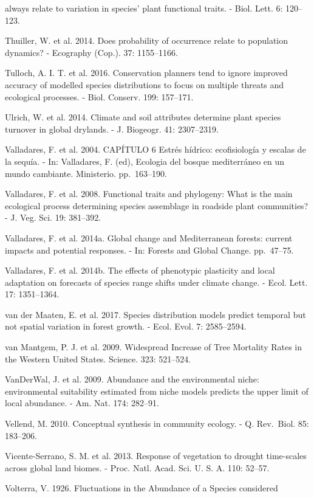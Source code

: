 \documentclass[11pt,twoside]{reedthesis}
\begin{document}
always relate to variation in species' plant functional traits. - Biol.
Lett. 6: 120--123.\par
Thuiller, W. et al. 2014. Does probability of occurrence relate to
population dynamics? - Ecography (Cop.). 37: 1155--1166.\par
Tulloch, A. I. T. et al. 2016. Conservation planners tend to ignore
improved accuracy of modelled species distributions to focus on multiple
threats and ecological processes. - Biol. Conserv. 199: 157--171.\par
Ulrich, W. et al. 2014. Climate and soil attributes determine plant
species turnover in global drylands. - J. Biogeogr. 41: 2307--2319.\par
Valladares, F. et al. 2004. CAPÍTULO 6 Estrés hídrico: ecofisiología y
escalas de la sequía. - In: Valladares, F. (ed), Ecologia del bosque
mediterráneo en un mundo cambiante. Ministerio. pp.~163--190.\par
Valladares, F. et al. 2008. Functional traits and phylogeny: What is the
main ecological process determining species assemblage in roadside plant
communities? - J. Veg. Sci. 19: 381--392.\par
Valladares, F. et al. 2014a. Global change and Mediterranean forests:
current impacts and potential responses. - In: Forests and Global
Change. pp.~47--75.\par
Valladares, F. et al. 2014b. The effects of phenotypic plasticity and
local adaptation on forecasts of species range shifts under climate
change. - Ecol. Lett. 17: 1351--1364.\par
van der Maaten, E. et al. 2017. Species distribution models predict
temporal but not spatial variation in forest growth. - Ecol. Evol. 7:
2585--2594.\par
van Mantgem, P. J. et al. 2009. Widespread Increase of Tree Mortality
Rates in the Western United States. Science. 323: 521--524.\par
VanDerWal, J. et al. 2009. Abundance and the environmental niche:
environmental suitability estimated from niche models predicts the upper
limit of local abundance. - Am. Nat. 174: 282--91.\par
Vellend, M. 2010. Conceptual synthesis in community ecology. - Q.
Rev.~Biol. 85: 183--206.\par
Vicente-Serrano, S. M. et al. 2013. Response of vegetation to drought
time-scales across global land biomes. - Proc. Natl. Acad. Sci. U. S. A.
110: 52--57.\par
Volterra, V. 1926. Fluctuations in the Abundance of a Species considered
\end{document}
